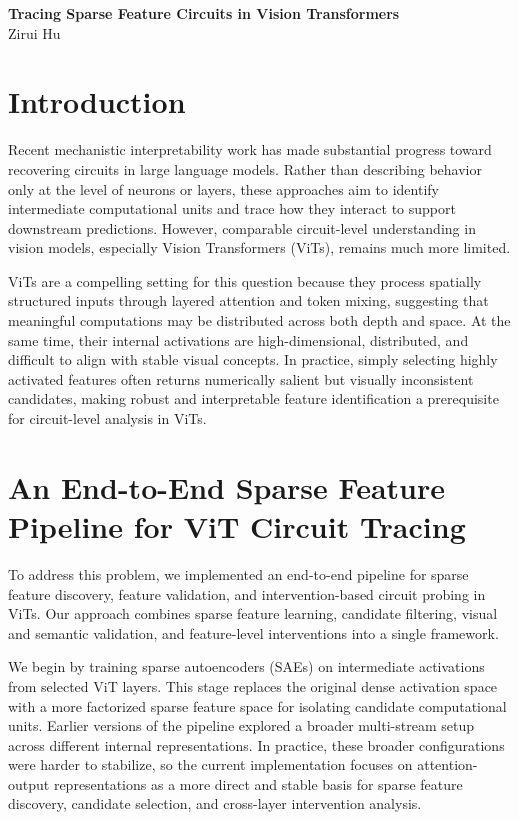 \documentclass[10pt]{article}
\begin{document}
\begin{center}
    {\Large \textbf{Tracing Sparse Feature Circuits in Vision Transformers}}\\[0.5em]
    Zirui Hu
\end{center}

\section{Introduction}

Recent mechanistic interpretability work has made substantial progress toward recovering circuits in large language models. Rather than describing behavior only at the level of neurons or layers, these approaches aim to identify intermediate computational units and trace how they interact to support downstream predictions. However, comparable circuit-level understanding in vision models, especially Vision Transformers (ViTs), remains much more limited.

ViTs are a compelling setting for this question because they process spatially structured inputs through layered attention and token mixing, suggesting that meaningful computations may be distributed across both depth and space. At the same time, their internal activations are high-dimensional, distributed, and difficult to align with stable visual concepts. In practice, simply selecting highly activated features often returns numerically salient but visually inconsistent candidates, making robust and interpretable feature identification a prerequisite for circuit-level analysis in ViTs.

\section{An End-to-End Sparse Feature Pipeline for ViT Circuit Tracing}

To address this problem, we implemented an end-to-end pipeline for sparse feature discovery, feature validation, and intervention-based circuit probing in ViTs. Our approach combines sparse feature learning, candidate filtering, visual and semantic validation, and feature-level interventions into a single framework.

We begin by training sparse autoencoders (SAEs) on intermediate activations from selected ViT layers. This stage replaces the original dense activation space with a more factorized sparse feature space for isolating candidate computational units. Earlier versions of the pipeline explored a broader multi-stream setup across different internal representations. In practice, these broader configurations were harder to stabilize, so the current implementation focuses on attention-output representations as a more direct and stable basis for sparse feature discovery, candidate selection, and cross-layer intervention analysis.
\end{document}
